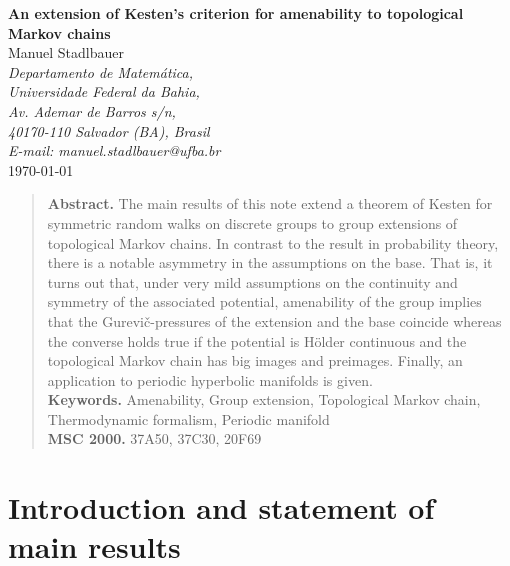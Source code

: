 \documentclass[10pt]{article}
\theoremstyle{mystyle}
\newcommand{\1}{\mathbf{1}}
\begin{document}
 
\vspace*{1cm}

\begin{center}
{\huge \bfseries\sffamily An extension of Kesten's criterion for amenability to topological Markov chains}\\

\bigskip \bigskip 
\singlespacing
Manuel Stadlbauer\\ 
\bigskip
\textit{\small 
Departamento de Matemática,\\ 
Universidade Federal da Bahia,\\
Av. Ademar de Barros s/n,\\
40170-110 Salvador (BA), Brasil\\
E-mail: {manuel.stadlbauer@ufba.br}}\\
\bigskip
{\small \today}
\end{center}

\bigskip
\begin{quote} 
\noindent \small \textbf{Abstract.} The main results of this note extend a theorem of Kesten for symmetric random walks on discrete groups to group extensions of topological Markov chains. In contrast to the result in probability theory, there is a notable asymmetry in the assumptions on the base. That is, it turns out that, under very mild assumptions on the continuity and symmetry of the associated potential, amenability of the group implies that the Gurevi\v{c}-pressures of the extension and the base coincide whereas the converse holds true if the potential is Hölder continuous and the topological Markov chain has big images and preimages. Finally, an application to periodic hyperbolic manifolds is given.\\[-.3cm]

\noindent \textbf{Keywords.} Amenability, Group extension, Topological Markov chain, Thermodynamic formalism, Periodic manifold\\ 
\noindent \textbf{MSC 2000.} 37A50, 37C30, 20F69
\end{quote}


\section{Introduction and statement of main results}
\end{document}
